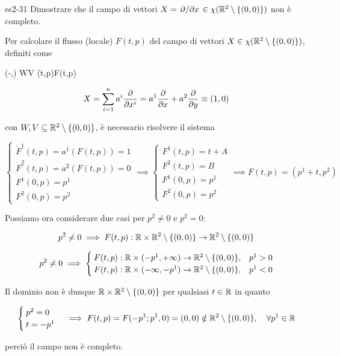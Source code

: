 {es2-31}
{
Dimostrare che il campo di vettori $ X = \pdv*{x} \in \chi(\mathbb{R}^{2} \setminus \{(0,0)\}) $ non è completo.
}
{
Per calcolare il flusso (locale) $ F(t,p) $ del campo di vettori $ X \in \chi(\mathbb{R}^{2} \setminus \{(0,0)\}) $, definiti come

	{(-\varepsilon,\varepsilon) \times W}{V}
	{(t,p)}{F(t,p)}

\begin{equation}
	X = \sum_{i=1}^{n} a^{i} \pdv{x^{i}} = a^{1} \pdv{x} + a^{2} \pdv{y} \equiv (1,0)
\end{equation}

con $ W,V \subseteq \mathbb{R}^{2} \setminus \{(0,0)\} $, è necessario risolvere il sistema

\begin{equation}
	\begin{cases}
		\dot{F}^{1}(t,p) = a^{1}(F(t,p)) = 1 \\
		\dot{F}^{2}(t,p) = a^{2}(F(t,p)) = 0 \\
		F^{1}(0,p) = p^{1} \\
		F^{2}(0,p) = p^{2}
	\end{cases} %
	\implies %
	\begin{cases}
		F^{1}(t,p) = t + A \\
		F^{2}(t,p) = B \\
		F^{1}(0,p) = p^{1} \\
		F^{2}(0,p) = p^{2}
	\end{cases} %
	\implies %
	F(t,p) = (p^{1} + t, p^{2})
\end{equation}

Possiamo ora considerare due casi per $ p^{2} \neq 0 $ e $ p^{2} = 0 $:

\begin{equation}
	p^{2} \neq 0 %
	\implies %
	F(t,p) : \R \times \R^{2} \setminus \{(0,0)\} \to \R^{2} \setminus \{(0,0)\}
\end{equation}

\begin{equation}
	p^{2} \neq 0 %
	\implies %
	\begin{cases}
		F(t,p) : \R \times (- p^{1}, + \infty) \to \R^{2} \setminus \{(0,0)\}, & p^{1} > 0 \\
		F(t,p) : \R \times (- \infty, - p^{1}) \to \R^{2} \setminus \{(0,0)\}, & p^{1} < 0
	\end{cases}
\end{equation}

Il dominio non è dunque $ \mathbb{R} \times \mathbb{R}^{2} \setminus \{(0,0)\} $ per qualsiasi $ t \in \mathbb{R} $ in quanto

\begin{equation}
	\begin{cases}
		p^{2} = 0 \\
		t = - p^{1}
	\end{cases} %
	\implies %
	F(t,p) = F(- p^{1}; p^{1}, 0) = (0,0) \notin \R^{2} \setminus \{(0,0)\} %
	\qcomma \forall p^{1} \in \R
\end{equation}

perciò il campo non è completo.
}

